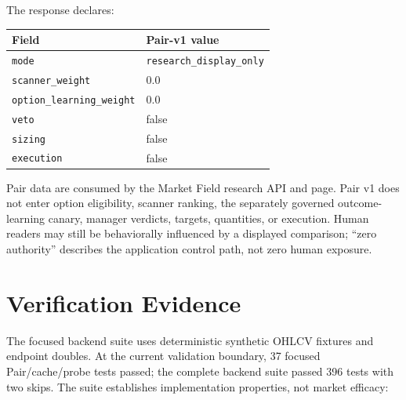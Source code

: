 \documentclass{article}
\begin{document}
The response declares:
\begin{center}
\begin{tabular}{ll}
\toprule
Field & Pair-v1 value \\
\midrule
\texttt{mode} & \texttt{research\_display\_only} \\
\texttt{scanner\_weight} & 0.0 \\
\texttt{option\_learning\_weight} & 0.0 \\
\texttt{veto} & false \\
\texttt{sizing} & false \\
\texttt{execution} & false \\
\bottomrule
\end{tabular}
\end{center}
Pair data are consumed by the Market Field research API and page. Pair v1 does not enter option eligibility, scanner ranking, the separately governed outcome-learning canary, manager verdicts, targets, quantities, or execution. Human readers may still be behaviorally influenced by a displayed comparison; ``zero authority'' describes the application control path, not zero human exposure.

\section{Verification Evidence}

The focused backend suite uses deterministic synthetic OHLCV fixtures and
endpoint doubles. At the current validation boundary, 37 focused
Pair/cache/probe tests passed; the complete backend suite passed 396 tests with
two skips. The suite establishes implementation properties, not market
efficacy:
\end{document}
